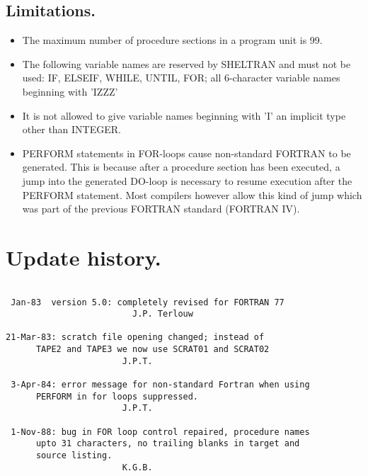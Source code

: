 \section{Limitations.}
\begin{itemize}

\item The maximum number of procedure sections in a program unit is 99. 

\item The following variable names are reserved by SHELTRAN and must not
be used: IF, ELSEIF, WHILE, UNTIL, FOR; all 6-character variable names
beginning with 'IZZZ'

\item It is not allowed to give variable names beginning with 'I' an
implicit type other than INTEGER. 

\item PERFORM statements in FOR-loops cause non-standard FORTRAN to be
generated.  This is because after a procedure section has been executed,
a jump into the generated DO-loop is necessary to resume execution after
the PERFORM statement.  Most compilers however allow this kind of jump
which was part of the previous FORTRAN standard (FORTRAN IV). 

\end{itemize}

\chapter{Update history.}
\begin{verbatim}

 Jan-83  version 5.0: completely revised for FORTRAN 77
                         J.P. Terlouw 

21-Mar-83: scratch file opening changed; instead of 
      TAPE2 and TAPE3 we now use SCRAT01 and SCRAT02
                       J.P.T.

 3-Apr-84: error message for non-standard Fortran when using
      PERFORM in for loops suppressed. 
                       J.P.T.
 
 1-Nov-88: bug in FOR loop control repaired, procedure names
      upto 31 characters, no trailing blanks in target and
      source listing.
                       K.G.B.

\end{verbatim}

